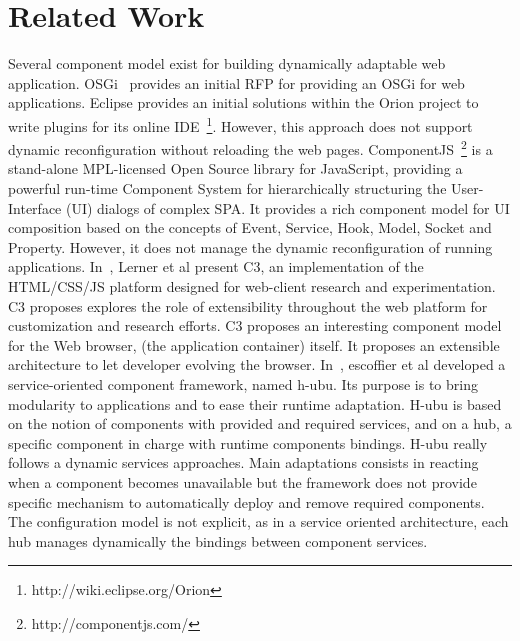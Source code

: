 \section{Related Work}

Several component model exist for building dynamically adaptable web application. OSGi~\cite{hall2011osgi} provides an initial RFP for providing an OSGi for web applications. Eclipse provides an initial solutions within the Orion project to write plugins for its online IDE~\footnote{http://wiki.eclipse.org/Orion}. However, this approach does not support dynamic reconfiguration without reloading the web pages.   ComponentJS~\footnote{http://componentjs.com/} is a stand-alone MPL-licensed Open Source library for JavaScript, providing a powerful run-time Component System for hierarchically structuring the User-Interface (UI) dialogs of complex SPA. It provides a rich component model for UI composition based on the concepts  of Event, Service, Hook, Model, Socket and Property. However, it does not manage the dynamic reconfiguration of running applications. In~\cite{150010}, Lerner et al present C3, an implementation of the HTML/CSS/JS platform designed for web-client research and experimentation. C3 proposes explores the role of extensibility throughout the web platform for customization and research efforts. C3 proposes an interesting component model for the Web browser, (the application container) itself. It proposes an extensible architecture to let developer evolving the browser.  In~\cite{escoffier:hal-00854339}, escoffier et al developed a service-oriented component framework, named h-ubu. Its purpose is to bring modularity to applications and to ease their runtime adaptation. H-ubu is based on the notion of components with provided and required services, and on a hub, a specific component in charge with runtime components bindings. H-ubu really follows a dynamic services approaches. Main adaptations consists in reacting when a component becomes unavailable but the framework does not provide specific mechanism to automatically deploy and remove required components. The configuration model is not explicit, as in a service oriented architecture, each hub manages dynamically the bindings between component services.